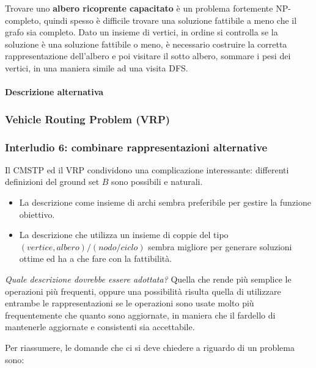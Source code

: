 \documentclass{article}
\begin{document}
Trovare uno \textbf{albero ricoprente capacitato} è un problema fortemente NP-completo, quindi spesso
è difficile trovare una soluzione fattibile a meno che il grafo sia completo. Dato un insieme di vertici,
in ordine si controlla se la soluzione è una soluzione fattibile o meno, è necessario costruire
la corretta rappresentazione dell'albero e poi visitare il sotto albero, sommare i pesi dei vertici, in
una maniera simile ad una visita DFS. \paragraph{Descrizione alternativa}

\subsubsection{Vehicle Routing Problem (VRP)}
\subsubsection{Interludio 6: combinare rappresentazioni alternative}
Il CMSTP ed il VRP condividono una complicazione interessante: differenti definizioni del
ground set $B$ sono possibili e naturali.
\begin{itemize}
    \item La descrizione come insieme di archi sembra preferibile per gestire la funzione obiettivo.
    \item La descrizione che utilizza un insieme di coppie del tipo
          \newline$(vertice, albero)/(nodo/ciclo)$ sembra migliore per generare
          soluzioni ottime ed ha a che fare con la fattibilità.
\end{itemize}

\noindent\textit{Quale descrizione dovrebbe essere adottata?} Quella che rende più semplice le operazioni più frequenti, oppure una possibilità risulta
quella di utilizzare entrambe le rappresentazioni se le operazioni sono usate molto più frequentemente
che quanto sono aggiornate, in maniera che il fardello di mantenerle aggiornate e consistenti sia accettabile.

Per riassumere, le domande che ci si deve chiedere a riguardo di un problema sono:
\end{document}
